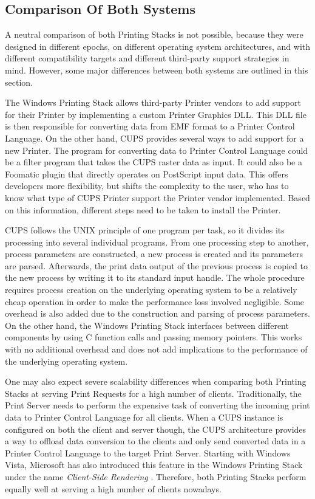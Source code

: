 \subsection{Comparison Of Both Systems}
A neutral comparison of both Printing Stacks is not possible, because they were designed in different epochs, on different operating system architectures, and with different compatibility targets and different third-party support strategies in mind.
However, some major differences between both systems are outlined in this section.

The Windows Printing Stack allows third-party Printer vendors to add support for their Printer by implementing a custom Printer Graphics \gls{DLL}.
This \gls{DLL} file is then responsible for converting data from \gls{EMF} format to a Printer Control Language.
On the other hand, \gls{CUPS} provides several ways to add support for a new Printer.
The program for converting data to Printer Control Language could be a filter program that takes the \gls{CUPS} raster data as input.
It could also be a Foomatic plugin that directly operates on PostScript input data.
This offers developers more flexibility, but shifts the complexity to the user, who has to know what type of \gls{CUPS} Printer support the Printer vendor implemented.
Based on this information, different steps need to be taken to install the Printer.

\gls{CUPS} follows the UNIX principle of one program per task, so it divides its processing into several individual programs.
From one processing step to another, process parameters are constructed, a new process is created and its parameters are parsed.
Afterwards, the print data output of the previous process is copied to the new process by writing it to its standard input handle.
The whole procedure requires process creation on the underlying operating system to be a relatively cheap operation in order to make the performance loss involved negligible.
Some overhead is also added due to the construction and parsing of process parameters.
On the other hand, the Windows Printing Stack interfaces between different components by using C function calls and passing memory pointers.
This works with no additional overhead and does not add implications to the performance of the underlying operating system.

One may also expect severe scalability differences when comparing both Printing Stacks at serving Print Requests for a high number of clients.
Traditionally, the Print Server needs to perform the expensive task of converting the incoming print data to Printer Control Language for all clients.
When a \gls{CUPS} instance is configured on both the client and server though, the \gls{CUPS} architecture provides a way to offload data conversion to the clients and only send converted data in a Printer Control Language to the target Print Server.
Starting with Windows Vista, Microsoft has also introduced this feature in the Windows Printing Stack under the name \emph{Client-Side Rendering} \cite{msdn2015csr}.
Therefore, both Printing Stacks perform equally well at serving a high number of clients nowadays.


